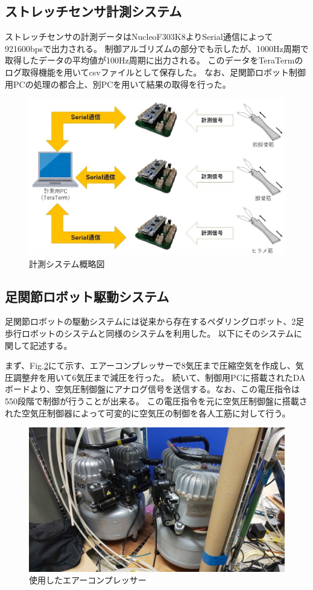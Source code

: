 \subsection{ストレッチセンサ計測システム}
ストレッチセンサの計測データはNucleoF303K8よりSerial通信によって921600bpsで出力される。
制御アルゴリズムの部分でも示したが、1000Hz周期で取得したデータの平均値が100Hz周期に出力される。
このデータをTeraTermのログ取得機能を用いてcsvファイルとして保存した。
なお、足関節ロボット制御用PCの処理の都合上、別PCを用いて結果の取得を行った。
\begin{figure}[h]
    \begin{center}
        \includegraphics[width=0.78\columnwidth,clip]{./3_analysis/getSystem.eps}
        \caption{計測システム概略図}
        \label{getSystem}
    \end{center}
\end{figure}

\subsection{足関節ロボット駆動システム}
足関節ロボットの駆動システムには従来から存在するペダリングロボット、2足歩行ロボットのシステムと同様のシステムを利用した。
以下にそのシステムに関して記述する。

まず、Fig.\ref{fig:compressor}にて示す、エアーコンプレッサーで8気圧まで圧縮空気を作成し、気圧調整弁を用いて6気圧まで減圧を行った。
続いて、制御用PCに搭載されたDAボードより、空気圧制御盤にアナログ信号を送信する。なお、この電圧指令は550段階で制御が行うことが出来る。
この電圧指令を元に空気圧制御盤に搭載された空気圧制御器によって可変的に空気圧の制御を各人工筋に対して行う。

\begin{figure}[h]
    \begin{center}
     \includegraphics[width=0.65\columnwidth,clip]{./3_analysis/compressor.eps}
     \caption{使用したエアーコンプレッサー}
     \label{fig:compressor}
    \end{center}
\end{figure}


